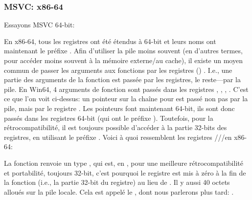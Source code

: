 \subsubsection{MSVC: x86-64}

Essayons MSVC 64-bit:




En x86-64, tous les registres ont été étendus à 64-bit et leurs noms ont maintenant le préfixe .
Afin d'utiliser la pile moins souvent (en d'autres termes, pour accéder moins souvent à la mémoire externe/au cache),
il existe un moyen commun de passer les arguments aux fonctions par les registres () .
I.e., une partie des arguments de la fonction est passée par les registres, le reste---par la pile.
En Win64, 4 arguments de fonction sont passés dans les registres \RCX, \RDX, , .
C'est ce que l'on voit ci-dessus: un pointeur sur la chaîne pour \printf est passé non pas par la pile,
mais par le registre \RCX.
Les pointeurs font maintenant 64-bit, ils sont donc passés dans les registres 64-bit (qui ont le préfixe ).
Toutefois, pour la rétrocompatibilité, il est toujours possible d'accéder à la partie 32-bits des registres,
en utilisant le préfixe .
Voici à quoi ressemblent les registres \RAX/\EAX/\AX/\AL en x86-64:


La fonction \main renvoie un type \Tint{}, qui est, en \CCpp, pour une meilleure rétrocompatibilité
et portabilité, toujours 32-bit, c'est pourquoi le registre \EAX est mis à zéro à la fin de la fonction (i.e., la
partie 32-bit du registre) au lieu de \RAX{}.
Il y aussi 40 octets alloués sur la pile locale.
Cela est appelé le , dont nous parlerons plus tard: .
